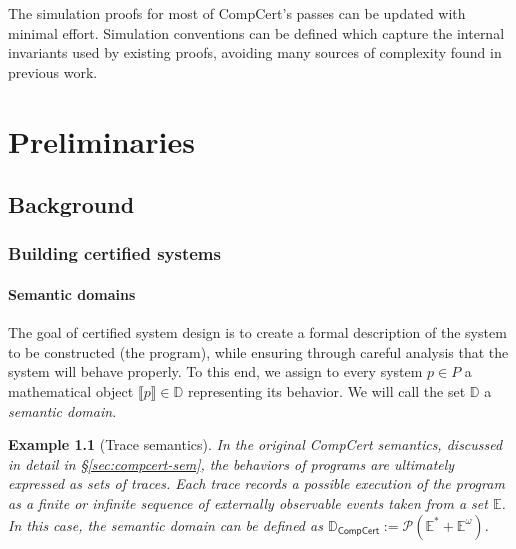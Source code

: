 \documentclass[draft,11pt]{report}
\newtheorem{example}[theorem]{Example}
\theoremstyle{definition}
\newcommand{\kw}[1]{\ensuremath{ \mathsf{#1} }}
\begin{document}
The simulation proofs for
most of CompCert's passes
can be updated with minimal effort.
Simulation conventions can be defined
which capture the internal invariants
used by existing proofs,
avoiding many sources of complexity found
in previous work.






\part{Preliminaries}

\chapter{Background} %

\section{Building certified systems} \label{sec:principles} %

\subsection{Semantic domains} %

The goal of certified system design is
to create a formal description of
the system to be constructed (the program),
while ensuring
through careful analysis
that the system
will behave properly.
To this end,
we assign
to every system $p \in P$
a mathematical object $\llbracket p \rrbracket \in \mathbb{D}$
representing its behavior.
We will call the set $\mathbb{D}$ a \emph{semantic domain}.

\begin{example}[Trace semantics]
In the original CompCert semantics,
discussed in detail in \S\ref{sec:compcert-sem},
the behaviors of programs are ultimately expressed
as sets of \emph{traces}.
Each trace records a possible execution of the program
as a finite or infinite sequence of externally observable events
taken from a set $\mathbb{E}$.
In this case, the semantic domain can be defined as
$
  \mathbb{D}_\kw{CompCert} :=
    \mathcal{P}(\mathbb{E}^* + \mathbb{E}^\omega)
$.
\end{example}
\end{document}
